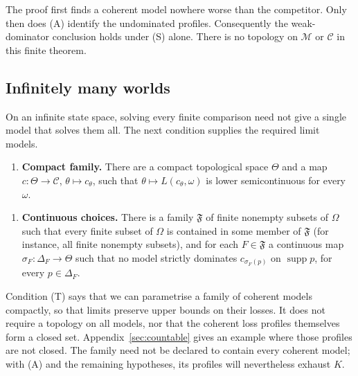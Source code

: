 \documentclass[11pt]{article}
\theoremstyle{definition}
\theoremstyle{remark}
\newcommand{\M}{\mathcal M}
\newcommand{\C}{\mathcal C}
\newcommand{\F}{\mathfrak F}
\newcommand{\supp}{\operatorname{supp}}
\begin{document}
The proof first finds a coherent model nowhere worse than the competitor. Only then does (A) identify the undominated profiles. Consequently the weak-dominator conclusion holds under (S) alone. There is no topology on $\M$ or $\C$ in this finite theorem.

\subsection{Infinitely many worlds}
On an infinite state space, solving every finite comparison need not give a single model that solves them all. The next condition supplies the required limit models.
\begin{enumerate}[label=\textbf{(T)},leftmargin=*]
\item \textbf{Compact family.} There are a compact topological space $\Theta$ and a map $c:\Theta\to\C$, $\theta\mapsto c_\theta$, such that $\theta\mapsto L(c_\theta,\omega)$ is lower semicontinuous for every $\omega$.
\end{enumerate}
\begin{enumerate}[label=\textbf{(S$_\infty$)},leftmargin=*]
\item \textbf{Continuous choices.} There is a family $\F$ of finite nonempty subsets of $\Omega$ such that every finite subset of $\Omega$ is contained in some member of $\F$ (for instance, all finite nonempty subsets), and for each $F\in\F$ a continuous map $\sigma_F:\Delta_F\to\Theta$ such that no model strictly dominates $c_{\sigma_F(p)}$ on $\supp p$, for every $p\in\Delta_F$.
\end{enumerate}


Condition (T) says that we can parametrise a family of coherent models compactly, so that limits preserve upper bounds on their losses. It does not require a topology on all models, nor that the coherent loss profiles themselves form a closed set. Appendix~\ref{sec:countable} gives an example where those profiles are not closed. The family need not be declared to contain every coherent model; with (A) and the remaining hypotheses, its profiles will nevertheless exhaust $K$.
\end{document}
